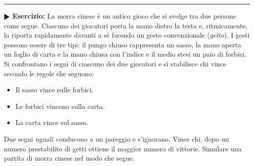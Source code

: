 \documentclass[11pt]{article}
\begin{document}
\hrule
\vspace{2mm}
\textbf{$\RHD$ Esercizio:}
La morra cinese \`e un antico gioco che si svolge tra due persone come segue.
Ciascuno dei giocatori porta la mano dietro la testa e, ritmicamente, la riporta
rapidamente davanti a s\'e facendo un gesto convenzionale ({\em getto}). 
I gesti possono essere di tre tipi: il pungo chiuso rappresenta un sasso, la mano aperta un foglio di carta e la mano chiusa con l'indice e il medio stesi un paio di forbici. Si confrontano i segni di ciascuno dei due giocatori e si stabilisce chi vince secondo le regole che seguono:
\begin{itemize}
\item Il sasso vince sulle forbici. 
\item Le forbici vincono sulla carta.
\item La carta vince sul sasso.
\end{itemize}
Due segni uguali conducono a un pareggio e s'ignorano. Vince chi, dopo un numero prestabilito di getti ottiene il maggior numero di vittorie. Simulare una partita di morra cinese nel modo che segue.
\end{document}
